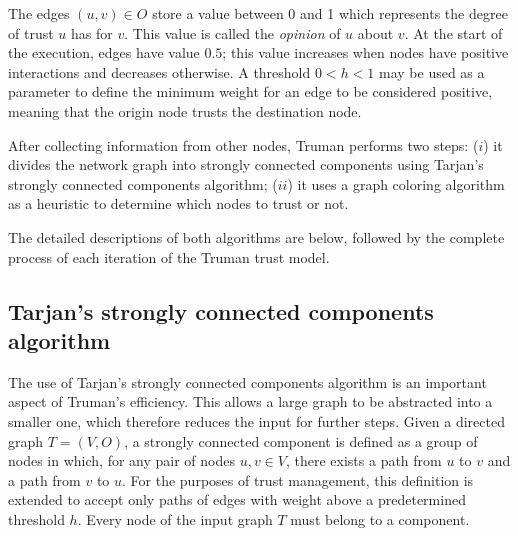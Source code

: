 \documentclass[conference]{IEEEtran}
\begin{document}
The edges $(u, v) \in O$ store a value between 0 and 1 which represents the degree of trust $u$ has for $v$.
This value is called the \textit{opinion} of $u$ about $v$.
At the start of the execution, edges have value $0.5$; this value increases when nodes have positive interactions and decreases otherwise.
A threshold $0 < h < 1$ may be used as a parameter to define the minimum weight for an edge to be considered positive, meaning that the origin node trusts the destination node.

After collecting information from other nodes, Truman performs two steps: ($i$) it divides the network graph into strongly connected components using Tarjan's strongly connected components algorithm; ($ii$) it uses a graph coloring algorithm as a heuristic to determine which nodes to trust or not.



The detailed descriptions of both algorithms are below, followed by the complete process of each iteration of the Truman trust model.



\subsection{Tarjan's strongly connected components algorithm}
\label{section:tarjan}
The use of Tarjan's strongly connected components algorithm \cite{tarjan1972depth} is an important aspect of Truman's efficiency.
This allows a large graph to be abstracted into a smaller one, which therefore reduces the input for further steps.
Given a directed graph $T = (V,O)$, a strongly connected component is defined as a group of nodes in which, for any pair of nodes $u, v \in V$, there exists a path from $u$ to $v$ and a path from $v$ to $u$.
For the purposes of trust management, this definition is extended to accept only paths of edges with weight above a predetermined threshold $h$.
Every node of the input graph $T$ must belong to a component.
\end{document}
